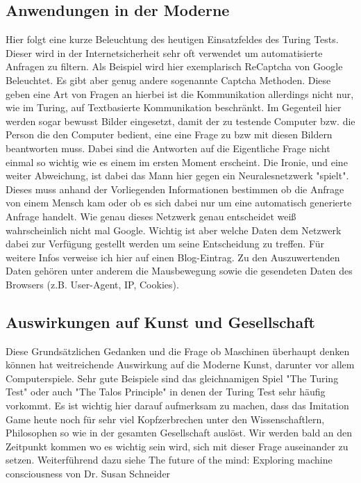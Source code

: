 \subsection{Anwendungen in der Moderne}
Hier folgt eine kurze Beleuchtung des heutigen Einsatzfeldes des Turing Tests. Dieser wird in der Internetsicherheit sehr oft verwendet um automatisierte Anfragen zu filtern. Als Beispiel wird hier exemplarisch ReCaptcha von Google Beleuchtet. Es gibt aber genug andere sogenannte Captcha Methoden. Diese geben eine Art von Fragen an hierbei ist die Kommunikation allerdings nicht nur, wie im Turing, auf Textbasierte Kommunikation beschränkt. Im Gegenteil hier werden sogar bewusst Bilder eingesetzt, damit der zu testende Computer bzw. die Person die den Computer bedient, eine eine Frage zu bzw mit diesen Bildern beantworten muss. Dabei sind die Antworten auf die Eigentliche Frage nicht einmal so wichtig wie es einem im ersten Moment erscheint. Die Ironie, und eine weiter Abweichung, ist dabei das Mann hier gegen ein Neuralesnetzwerk "spielt". Dieses muss anhand der Vorliegenden Informationen bestimmen ob die Anfrage von einem Mensch kam oder ob es sich dabei nur um eine automatisch generierte Anfrage handelt. Wie genau dieses Netzwerk genau entscheidet weiß wahrscheinlich nicht mal Google. Wichtig ist aber welche Daten dem Netzwerk dabei zur Verfügung gestellt werden um seine Entscheidung zu treffen. Für weitere Infos verweise ich hier auf einen Blog-Eintrag\cite{captcha}. Zu den Auszuwertenden Daten gehören unter anderem die Mausbewegung sowie die gesendeten Daten des Browsers (z.B. User-Agent, IP, Cookies).
\subsection{Auswirkungen auf Kunst und Gesellschaft}
Diese Grundsätzlichen Gedanken und die Frage ob Maschinen überhaupt denken können hat weitreichende Auswirkung auf die Moderne Kunst, darunter vor allem Computerspiele. Sehr gute Beispiele sind das gleichnamigen Spiel "The Turing Test" oder auch "The Talos Principle" in denen der Turing Test sehr häufig vorkommt. Es ist wichtig hier darauf aufmerksam zu machen, dass das Imitation Game heute noch für sehr viel Kopfzerbrechen unter den Wissenschaftlern, Philosophen so wie in der gesamten Gesellschaft auslöst. Wir werden bald an den Zeitpunkt kommen wo es wichtig sein wird, sich mit dieser Frage auseinander zu setzen. Weiterführend dazu siehe The future of the mind: Exploring machine consciousness von Dr. Susan Schneider\cite{explorecons}

